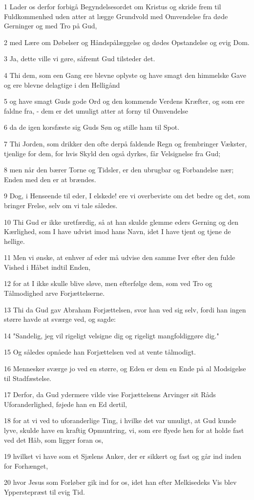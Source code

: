 \par 1 Lader os derfor forbigå Begyndelsesordet om Kristus og skride frem til Fuldkommenhed uden atter at lægge Grundvold med Omvendelse fra døde Gerninger og med Tro på Gud,
\par 2 med Lære om Døbelser og Håndspålæggelse og dødes Opstandelse og evig Dom.
\par 3 Ja, dette ville vi gøre, såfremt Gud tilsteder det.
\par 4 Thi dem, som een Gang ere blevne oplyste og have smagt den himmelske Gave og ere blevne delagtige i den Helligånd
\par 5 og have smagt Guds gode Ord og den kommende Verdens Kræfter, og som ere faldne fra, - dem er det umuligt atter at forny til Omvendelse
\par 6 da de igen korsfæste sig Guds Søn og stille ham til Spot.
\par 7 Thi Jorden, som drikker den ofte derpå faldende Regn og frembringer Vækster, tjenlige for dem, for hvis Skyld den også dyrkes, får Velsignelse fra Gud;
\par 8 men når den bærer Torne og Tidsler, er den ubrugbar og Forbandelse nær; Enden med den er at brændes.
\par 9 Dog, i Henseende til eder, I elskede! ere vi overbeviste om det bedre og det, som bringer Frelse, selv om vi tale således.
\par 10 Thi Gud er ikke uretfærdig, så at han skulde glemme eders Gerning og den Kærlighed, som I have udvist imod hans Navn, idet I have tjent og tjene de hellige.
\par 11 Men vi ønske, at enhver af eder må udvise den samme Iver efter den fulde Vished i Håbet indtil Enden,
\par 12 for at I ikke skulle blive sløve, men efterfølge dem, som ved Tro og Tålmodighed arve Forjættelserne.
\par 13 Thi da Gud gav Abraham Forjættelsen, svor han ved sig selv, fordi han ingen større havde at sværge ved, og sagde:
\par 14 "Sandelig, jeg vil rigeligt velsigne dig og rigeligt mangfoldiggøre dig."
\par 15 Og således opnåede han Forjættelsen ved at vente tålmodigt.
\par 16 Mennesker sværge jo ved en større, og Eden er dem en Ende på al Modsigelse til Stadfæstelse.
\par 17 Derfor, da Gud ydermere vilde vise Forjættelsens Arvinger sit Råds Uforanderlighed, føjede han en Ed dertil,
\par 18 for at vi ved to uforanderlige Ting, i hvilke det var umuligt, at Gud kunde lyve, skulde have en kraftig Opmuntring, vi, som ere flyede hen for at holde fast ved det Håb, som ligger foran os,
\par 19 hvilket vi have som et Sjælens Anker, der er sikkert og fast og går ind inden for Forhænget,
\par 20 hvor Jesus som Forløber gik ind for os, idet han efter Melkisedeks Vis blev Ypperstepræst til evig Tid.

